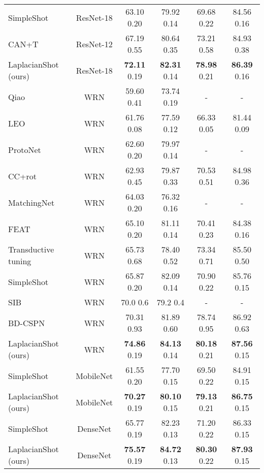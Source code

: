 \documentclass{article}
\begin{document}
\begin{table*}[t]
\begin{center}
\begin{small}
\begin{tabular}{lc|cc|cc}
SimpleShot \cite{wang2019simpleshot}& ResNet-18 & 63.10  0.20 & 79.92  0.14& 69.68  0.22 & 84.56  0.16\\
CAN+T \cite{can}& ResNet-12 & 67.19  0.55 & 80.64  0.35& 73.21  0.58 & 84.93  0.38\\
\rowcolor{Gray}
LaplacianShot (ours) & ResNet-18 & \textbf{72.11}  0.19 & \textbf{82.31}  0.14& \textbf{78.98}  0.21 & \textbf{86.39}  0.16\\
\hline
Qiao \cite{qiao2018few}  & WRN & 59.60  0.41 & 73.74  0.19&-&-\\
LEO \cite{rusu2018metalearning} & WRN & 61.76  0.08 &77.59  0.12& 66.33  0.05 & 81.44  0.09\\
ProtoNet \cite{snell2017prototypical} & WRN & 62.60  0.20 & 79.97  0.14&-&-\\
CC+rot \cite{gidaris2019boosting}  & WRN & 62.93  0.45 & 79.87  0.33& 70.53  0.51 & 84.98  0.36\\
MatchingNet \cite{Vinyals2016MatchingNF} & WRN & 64.03  0.20 & 76.32  0.16&-&-\\
FEAT \cite{ye2020fewshot} & WRN & 65.10  0.20 & 81.11  0.14& 70.41  0.23 & 84.38  0.16\\
Transductive tuning \cite{Dhillon2020A} & WRN & 65.73  0.68 & 78.40  0.52& 73.34  0.71 & 85.50  0.50\\
SimpleShot \cite{wang2019simpleshot}& WRN & 65.87 0.20 & 82.09  0.14& 70.90  0.22 & 85.76  0.15\\
SIB  \cite{hu2020empirical} & WRN & 70.0  0.6 & 79.2  0.4&-&-\\
BD-CSPN \cite{liu2019prototype} & WRN & 70.31  0.93 & 81.89  0.60& 78.74  0.95 & 86.92  0.63\\

\rowcolor{Gray}
LaplacianShot (ours) & WRN & \textbf{74.86}  0.19 & \textbf{84.13}  0.14& \textbf{80.18}  0.21 & \textbf{87.56} 0.15\\
\hline
SimpleShot \cite{wang2019simpleshot}& MobileNet & 61.55  0.20 & 77.70  0.15& 69.50  0.22 & 84.91  0.15\\
\rowcolor{Gray}
LaplacianShot (ours) & MobileNet & \textbf{70.27}  0.19 & \textbf{80.10}  0.15& \textbf{79.13}  0.21 & \textbf{86.75}  0.15\\
\hline
SimpleShot \cite{wang2019simpleshot}& DenseNet& 65.77  0.19 & 82.23  0.13&71.20  0.22 & 86.33  0.15\\
\rowcolor{Gray}
LaplacianShot (ours) & DenseNet & \textbf{75.57}  0.19 & \textbf{84.72}  0.13& \textbf{80.30}  0.22 & \textbf{87.93}  0.15\\
\bottomrule
\end{tabular}
\end{small}
\end{center}
\vskip -0.1in
\end{table*}
\end{document}
